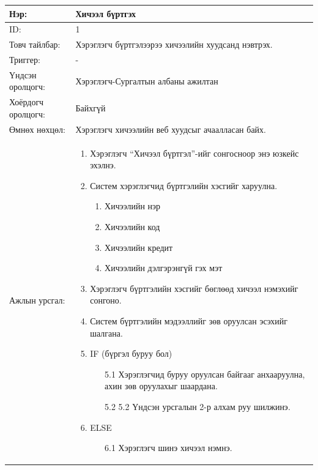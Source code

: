 \begin{center}
	\begin{table}[!htbp]
		\label{Хичээл бүртгэх}
		\begin{tabular}{|p{2cm}|p{13cm}|}
		\hline
			Нэр: & Хичээл бүртгэх \\
		\hline
			ID: & 1 \\
		\hline
			Товч тайлбар: & Хэрэглэгч бүртгэлээрээ хичээлийн  хуудсанд нэвтрэх. \\
		\hline
			Триггер: & - \\
		\hline
			Үндсэн оролцогч: & Хэрэглэгч-Сургалтын албаны ажилтан \\
		\hline
			Хоёрдогч оролцогч: & Байхгүй  \\
		\hline
			Өмнөх нөхцөл: &  Хэрэглэгч хичээлийн веб хуудсыг ачаалласан байх.\\
		\hline
			Ажлын урсгал: & \begin{enumerate}
						 	\item Хэрэглэгч “Хичээл бүртгэл”-ийг сонгосноор энэ юзкейс эхэлнэ. 
						 	\item Систем хэрэглэгчид бүртгэлийн хэсгийг харуулна. 
						 	\begin{enumerate}
						 		\item Хичээлийн нэр
						 		\item Хичээлийн код
						 		\item Хичээлийн кредит
						 		\item Хичээлийн дэлгэрэнгүй гэх мэт
						 	\end{enumerate}
						 	\item Хэрэглэгч бүртгэлийн хэсгийг бөглөөд хичээл нэмэхийг сонгоно. 
						 	\item Систем бүртгэлийн мэдээллийг зөв оруулсан эсэхийг шалгана.
						 	\item IF (бүргэл буруу бол)
							 	\begin{enumerate}
							 		\item[5.1]	Хэрэглэгчид буруу оруулсан байгааг анхааруулна, ахин зөв оруулахыг шаардана.
							 		\item[5.2] 5.2	Үндсэн урсгалын 2-р алхам руу шилжинэ. 
							 	\end{enumerate}
						 	\item ELSE
							 	\begin{enumerate}
							 		\item[6.1] Хэрэглэгч шинэ хичээл нэмнэ.
							 	\end{enumerate}
						  \end{enumerate}

\end{tabular}
\end{table}
\end{center}

